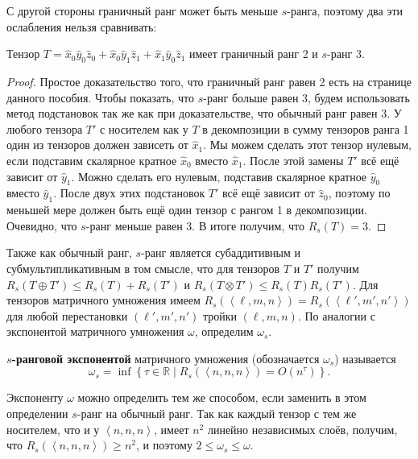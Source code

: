 С другой стороны граничный ранг может быть меньше $s$-ранга, поэтому два эти ослабления нельзя сравнивать:
\begin{prop}
  \label{prop:12:3.3} Тензор $T = \widehat{x}_0 \widehat{y}_0 \widehat{z}_0 + \widehat{x}_0 \widehat{y}_1 \widehat{z}_1 + \widehat{x}_1 \widehat{y}_0 \widehat{z}_1$ имеет граничный ранг 2 и $s$-ранг 3.
\end{prop}
\begin{proof}
  Простое доказательство того, что граничный ранг равен 2 есть на странице \pageref{border_rank_2} данного пособия. Чтобы показать, что $s$-ранг больше равен 3, будем использовать метод подстановок так же как при доказательстве, что обычный ранг равен 3. У любого тензора $T'$ с носителем как у $T$ в декомпозиции в сумму тензоров ранга 1 один из тензоров должен зависеть от $\widehat{x}_1$. Мы можем сделать этот тензор нулевым, если подставим скалярное кратное $\widehat{x}_0$ вместо $\widehat{x}_1$. После этой замены $T'$ всё ещё зависит от $\widehat{y}_1$. Можно сделать его нулевым, подставив скалярное кратное $\widehat{y}_0$ вместо $\widehat{y}_1$. После двух этих подстановок $T'$ всё ещё зависит от $\widehat{z}_0$, поэтому по меньшей мере должен быть ещё один тензор с рангом 1 в декомпозиции. Очевидно, что $s$-ранг меньше равен 3. В итоге получим, что $R_s(T) = 3$.
\end{proof}

Также как обычный ранг, $s$-ранг является субаддитивным и субмультипликативным в том смысле, что для тензоров $T$ и $T'$ получим $R_s(T \oplus T') \leq R_s(T) + R_s(T')$ и $R_s(T \otimes  T') \leq R_s(T) R_s(T')$. Для тензоров матричного умножения имеем $R_s(\left\langle \ell, m, n \right\rangle) = R_s(\left\langle \ell', m', n' \right\rangle)$ для любой перестановки $(\ell', m', n')$ тройки $(\ell, m, n)$. По аналогии с экспонентой матричного умножения $\omega$, определим $\omega_s$.
\begin{definition}
 \textbf{$s$-ранговой экспонентой} матричного умножения (обозначается $\omega_s$) называется 
 \[
 	\omega_s = \inf \left\{ \tau \in \mathbb{R} \mid R_s(\left\langle n,n,n \right\rangle) = O(n^\tau) \right\}.
 \]
\end{definition}

Экспоненту $\omega$ можно определить тем же способом, если заменить в этом определении $s$-ранг на обычный ранг. Так как каждый тензор с тем же носителем, что и у $\left\langle n,n,n \right\rangle$, имеет $n^2$ линейно независимых слоёв, получим, что $R_s(\left\langle n,n,n \right\rangle) \geq n^2$, и поэтому $2 \leq \omega_s \leq \omega$.

